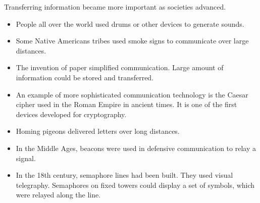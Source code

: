 \begin{refsection}
Transferring information became more important as societies advanced.
\begin{itemize}
	\item People all over the world used drums or other devices to generate sounds.
	\item Some Native Americans tribes used smoke signs to communicate over large distances.
	\item The invention of paper simplified communication. Large amount of information could be stored and transferred.
	\item An example of more sophisticated communication technology is the  Caesar cipher used in the Roman Empire in ancient times. It is one of the first devices developed for cryptography.
	\item Homing pigeons delivered letters over long distances.
	\item In the Middle Ages, beacons were used in defensive communication to relay a signal.
	\item In the 18th century, semaphore lines had been built. They used visual telegraphy. Semaphores on fixed towers could display a set of symbols, which were relayed along the line.
\end{itemize}


\end{refsection}
